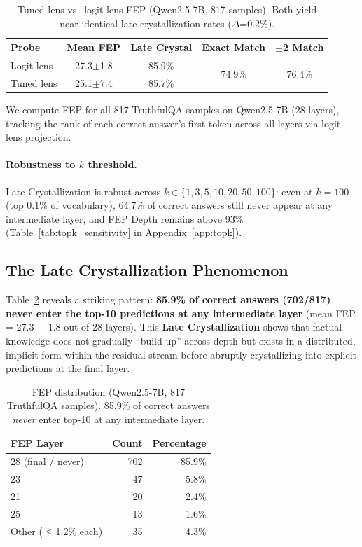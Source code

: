 \documentclass{article}
\begin{document}
\begin{table}[t]
\centering\small
\begin{tabular}{lcccc}
\toprule
\textbf{Probe} & \textbf{Mean FEP} & \textbf{Late Crystal} & \textbf{Exact Match} & \textbf{$\pm$2 Match} \\
\midrule
Logit lens & 27.3$\pm$1.8 & 85.9\% & \multirow{2}{*}{74.9\%} & \multirow{2}{*}{76.4\%} \\
Tuned lens & 25.1$\pm$7.4 & 85.7\% & & \\
\bottomrule
\end{tabular}
\caption{Tuned lens vs.\ logit lens FEP (Qwen2.5-7B, 817 samples). Both yield near-identical late crystallization rates ($\Delta$=0.2\%).}
\label{tab:tuned_lens}
\end{table}

We compute FEP for all 817 TruthfulQA samples on Qwen2.5-7B (28 layers), tracking the rank of each correct answer's first token across all layers via logit lens projection.

\paragraph{Robustness to $k$ threshold.} Late Crystallization is robust across $k \in \{1, 3, 5, 10, 20, 50, 100\}$: even at $k{=}100$ (top 0.1\% of vocabulary), 64.7\% of correct answers still never appear at any intermediate layer, and FEP Depth remains above 93\% (Table~\ref{tab:topk_sensitivity} in Appendix~\ref{app:topk}).

\subsection{The Late Crystallization Phenomenon}

Table~\ref{tab:fep_distribution} reveals a striking pattern: \textbf{85.9\% of correct answers (702/817) never enter the top-10 predictions at any intermediate layer} (mean FEP = 27.3 $\pm$ 1.8 out of 28 layers). This \textbf{Late Crystallization} shows that factual knowledge does not gradually ``build up'' across depth but exists in a distributed, implicit form within the residual stream before abruptly crystallizing into explicit predictions at the final layer.

\begin{table}[t]
\centering
\small
\begin{tabular}{lrr}
\toprule
\textbf{FEP Layer} & \textbf{Count} & \textbf{Percentage} \\
\midrule
28 (final / never) & 702 & 85.9\% \\
23 & 47 & 5.8\% \\
21 & 20 & 2.4\% \\
25 & 13 & 1.6\% \\
Other ($\leq$1.2\% each) & 35 & 4.3\% \\
\bottomrule
\end{tabular}
\caption{FEP distribution (Qwen2.5-7B, 817 TruthfulQA samples). 85.9\% of correct answers \emph{never} enter top-10 at any intermediate layer.}
\label{tab:fep_distribution}
\end{table}
\end{document}
